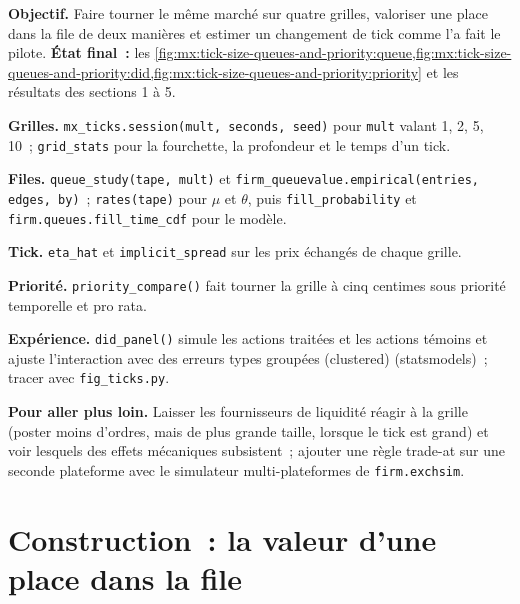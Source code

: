 \begin{tutorial}
\textbf{Objectif.} Faire tourner le même marché sur quatre grilles, valoriser une place dans la file de deux manières et estimer un changement de tick comme l'a fait le pilote.
\textbf{État final~:} les \cref{fig:mx:tick-size-queues-and-priority:queue,fig:mx:tick-size-queues-and-priority:did,fig:mx:tick-size-queues-and-priority:priority}
et les résultats des sections 1 à 5.
\begin{tutsteps}
\item \textbf{Grilles.} \texttt{mx\_ticks.session(mult, seconds, seed)} pour \texttt{mult} valant 1, 2, 5, 10~; \texttt{grid\_stats} pour la fourchette, la profondeur et
le temps d'un tick.
\item \textbf{Files.} \texttt{queue\_study(tape, mult)} et \texttt{firm\_queuevalue.empirical(entries, edges, by)}~; \texttt{rates(tape)} pour $\mu$
et $\theta$, puis \texttt{fill\_probability} et \texttt{firm.queues.fill\_time\_cdf} pour le modèle.
\item \textbf{Tick.} \texttt{eta\_hat} et \texttt{implicit\_spread} sur les prix échangés de chaque grille.
\item \textbf{Priorité.} \texttt{priority\_compare()} fait tourner la grille à cinq centimes sous priorité temporelle et pro rata.
\item \textbf{Expérience.} \texttt{did\_panel()} simule les actions traitées et les actions témoins et ajuste l'interaction avec des erreurs types groupées (clustered)
(statsmodels)~; tracer avec \texttt{fig\_ticks.py}.
\end{tutsteps}
\textbf{Pour aller plus loin.} Laisser les fournisseurs de liquidité réagir à la grille (poster moins d'ordres, mais de plus grande taille, lorsque le tick est grand) et voir lesquels des
effets mécaniques subsistent~; ajouter une règle trade-at sur une seconde plateforme avec le simulateur multi-plateformes de \texttt{firm.exchsim}.
\end{tutorial}

\section{Construction~: la valeur d'une place dans la file}\label{bld:mx:tick-size-queues-and-priority:queuevalue}

